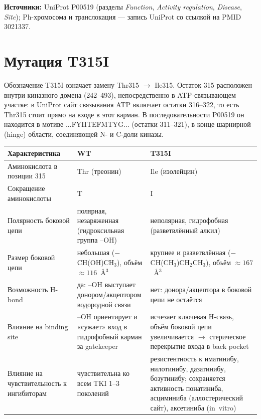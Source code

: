 \documentclass[12pt,a4paper]{article}
\newcommand{\code}[1]{{\ttfamily #1}}
\begin{document}
\medskip
\noindent\textbf{Источники:} UniProt P00519 (разделы \emph{Function}, \emph{Activity
regulation}, \emph{Disease}, \emph{Site}); Ph-хромосома и транслокация --- запись
UniProt со ссылкой на PMID 3021337.

\section{Мутация T315I}

Обозначение T315I означает замену Thr315 $\rightarrow$ Ile315. Остаток 315 расположен
внутри киназного домена (242--493), непосредственно в ATP-связывающем участке: в UniProt
сайт связывания ATP включает остатки 316--322, то есть Thr315 стоит прямо на входе в
этот карман. В последовательности P00519 он находится в мотиве \code{...FYIITEFMTYG...}
(остатки 311--321), в конце шарнирной (hinge) области, соединяющей N- и C-доли киназы.

\begin{center}
\begin{tabular}{L{4.3cm}L{4.9cm}L{5.3cm}}
\toprule
\textbf{Характеристика} & \textbf{WT} & \textbf{T315I} \\
\midrule
Аминокислота в позиции 315 & Thr (треонин) & Ile (изолейцин) \\
Сокращение аминокислоты & T & I \\
Полярность боковой цепи & полярная, незаряженная (гидроксильная группа --OH) & неполярная, гидрофобная (разветвлённый алкил) \\
Размер боковой цепи & небольшая ($-$CH(OH)CH$_3$), объём ${\approx}116$~\AA$^3$ & крупнее и разветвлённая ($-$CH(CH$_3$)CH$_2$CH$_3$), объём ${\approx}167$~\AA$^3$ \\
Возможность H-bond & да: --OH выступает донором/акцептором водородной связи & нет: донора/акцептора в боковой цепи не остаётся \\
Влияние на binding site & --OH ориентирует и «сужает» вход в гидрофобный карман за gatekeeper & исчезает ключевая H-связь, объём боковой цепи увеличивается $\rightarrow$ стерическое перекрытие входа в back pocket \\
Влияние на чувствительность к ингибиторам & чувствительна ко всем TKI 1--3 поколений & резистентность к иматинибу, нилотинибу, дазатинибу, бозутинибу; сохраняется активность понатиниба, асциминиба (аллостерический сайт), аксетиниба (in~vitro) \\
\bottomrule
\end{tabular}
\end{center}
\end{document}
